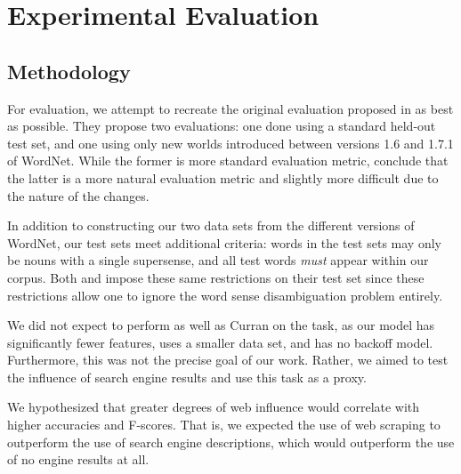 \documentclass{article}
\begin{document}
\section{Experimental Evaluation}

\subsection{Methodology}


For evaluation, we attempt to recreate the original evaluation proposed in \cite{cj} as best as possible. 
They propose two evaluations: one done using a standard held-out test set, and one using only new worlds introduced between versions 1.6 and 1.7.1 of WordNet. 
While the former is more standard evaluation metric, \cite{cj} conclude that the latter is a more natural evaluation metric and slightly more difficult due to the nature of the changes.

In addition to constructing our two data sets from the different versions of WordNet, our test sets meet additional criteria: words in the test sets may only be nouns with a single supersense, and all test words \emph{must} appear within our corpus. 
Both \cite{cj} and \cite{curran} impose these same restrictions on their test set since these restrictions allow one to ignore the word sense disambiguation problem entirely.

We did not expect to perform as well as Curran \cite{curran} on the task, as our model has significantly fewer features, uses a smaller data set, and has no backoff model. 
Furthermore, this was not the precise goal of our work. 
Rather, we aimed to test the influence of search engine results and use this task as a proxy.

We hypothesized that greater degrees of web influence would correlate with higher accuracies and F-scores. 
That is, we expected the use of web scraping to outperform the use of search engine descriptions, which would outperform the use of no engine results at all.
\end{document}

